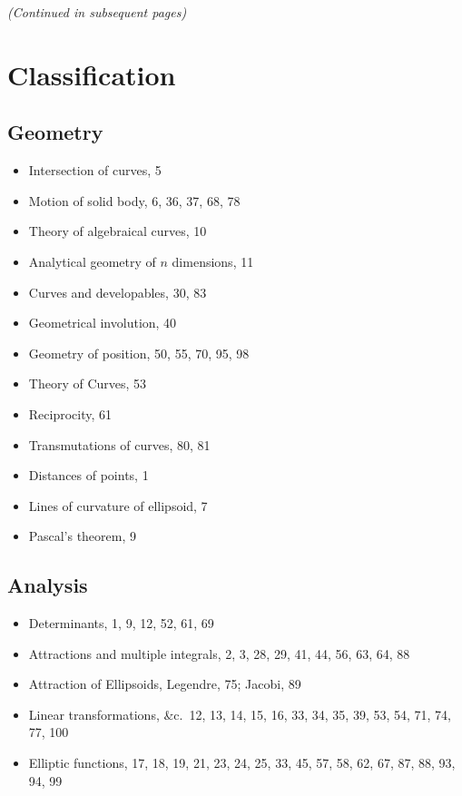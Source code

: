 \documentclass[11pt,a4paper]{book}
\begin{document}
\vfill
\begin{center}
\textit{(Continued in subsequent pages)}
\end{center}
\cleardoublepage

\chapter*{Classification}

\section*{Geometry}
\begin{itemize}[leftmargin=*,noitemsep]
\item Intersection of curves, 5
\item Motion of solid body, 6, 36, 37, 68, 78
\item Theory of algebraical curves, 10
\item Analytical geometry of $n$ dimensions, 11
\item Curves and developables, 30, 83
\item Geometrical involution, 40
\item Geometry of position, 50, 55, 70, 95, 98
\item Theory of Curves, 53
\item Reciprocity, 61
\item Transmutations of curves, 80, 81
\item Distances of points, 1
\item Lines of curvature of ellipsoid, 7
\item Pascal's theorem, 9
\end{itemize}

\section*{Analysis}
\begin{itemize}[leftmargin=*,noitemsep]
\item Determinants, 1, 9, 12, 52, 61, 69
\item Attractions and multiple integrals, 2, 3, 28, 29, 41, 44, 56, 63, 64, 88
\item Attraction of Ellipsoids, Legendre, 75; Jacobi, 89
\item Linear transformations, \&c.\ 12, 13, 14, 15, 16, 33, 34, 35, 39, 53, 54, 71, 74, 77, 100
\item Elliptic functions, 17, 18, 19, 21, 23, 24, 25, 33, 45, 57, 58, 62, 67, 87, 88, 93, 94, 99
\end{itemize}
\end{document}
